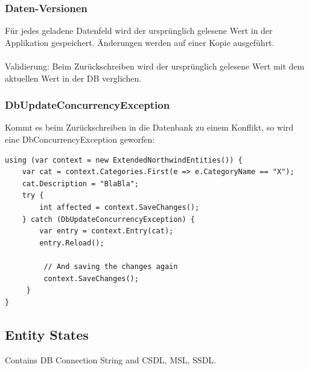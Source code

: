 \documentclass[
a4paper,
oneside,
10pt,
fleqn,
headsepline,
toc=listofnumbered, 
bibliography=totocnumbered]{scrartcl}
\begin{document}
\subsubsection{Daten-Versionen}
Für jedes geladene Datenfeld wird der ursprünglich gelesene Wert in der Applikation gespeichert. Änderungen werden auf einer Kopie ausgeführt.\\
\\
Validierung: Beim Zurückschreiben wird der ursprünglich gelesene Wert mit dem aktuellen Wert in der DB verglichen. \\

\subsubsection{DbUpdateConcurrencyException}
Kommt es beim Zurückschreiben in die Datenbank zu einem Konflikt, so wird eine DbConcurrencyException geworfen: \\

\begin{lstlisting}
using (var context = new ExtendedNorthwindEntities()) {
	var cat = context.Categories.First(e => e.CategoryName == "X");
	cat.Description = "BlaBla";
	try {
		int affected = context.SaveChanges();
	} catch (DbUpdateConcurrencyException) {
		var entry = context.Entry(cat);
		entry.Reload();
	
		 // And saving the changes again
		 context.SaveChanges();
	 }
}
\end{lstlisting}

\subsection{Entity States}

Contains DB Connection String and CSDL, MSL, SSDL.
\end{document}
